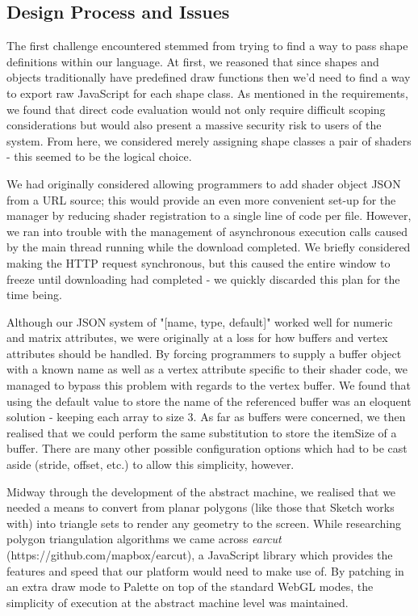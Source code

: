 \documentclass{l3proj}
\begin{document}
\subsection{Design Process and Issues}
\label{arch-shad-design}
The first challenge encountered stemmed from trying to find a way to pass shape definitions within our language. At first, we reasoned that since shapes and objects traditionally have predefined draw functions then we'd need to find a way to export raw JavaScript for each shape class. As mentioned in the requirements, we found that direct code evaluation would not only require difficult scoping considerations but would also present a massive security risk to users of the system. From here, we considered merely assigning shape classes a pair of shaders - this seemed to be the logical choice.

We had originally considered allowing programmers to add shader object JSON from a URL source; this would provide an even more convenient set-up for the manager by reducing shader registration to a single line of code per file. However, we ran into trouble with the management of asynchronous execution calls caused by the main thread running while the download completed. We briefly considered making the HTTP request synchronous, but this caused the entire window to freeze until downloading had completed - we quickly discarded this plan for the time being.

Although our JSON system of "[name, type, default]" worked well for numeric and matrix attributes, we were originally at a loss for how buffers and vertex attributes should be handled. By forcing programmers to supply a buffer object with a known name as well as a vertex attribute specific to their shader code, we managed to bypass this problem with regards to the vertex buffer. We found that using the default value to store the name of the referenced buffer was an eloquent solution - keeping each array to size 3. As far as buffers were concerned, we then realised that we could perform the same substitution to store the itemSize of a buffer. There are many other possible configuration options which had to be cast aside (stride, offset, etc.) to allow this simplicity, however.

Midway through the development of the abstract machine, we realised that we needed a means to convert from planar polygons (like those that Sketch works with) into triangle sets to render any geometry to the screen. While researching polygon triangulation algorithms we came across \textit{earcut} (https://github.com/mapbox/earcut), a JavaScript library which provides the features and speed that our platform would need to make use of. By patching in an extra draw mode to Palette on top of the standard WebGL modes, the simplicity of execution at the abstract machine level was maintained. 
\end{document}
